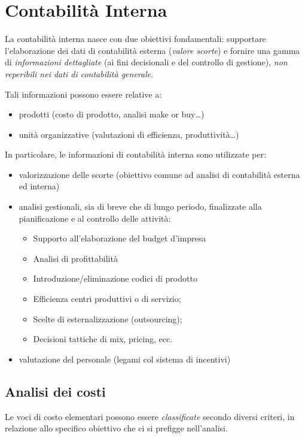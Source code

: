 \chapter{Contabilità Interna}
La contabilità interna nasce con due obiettivi fondamentali:
supportare l’elaborazione dei dati di contabilità esterna (\emph{valore scorte})
e fornire una gamma di \emph{informazioni dettagliate} (ai fini decisionali e del
controllo di gestione), \emph{non reperibili nei dati di contabilità generale}.

Tali informazioni possono essere relative a:
\begin{itemize}
    \item prodotti (costo di prodotto, analisi make or buy\dots)
    \item unità organizzative (valutazioni di efficienza, produttività\dots)
\end{itemize}

In particolare, le informazioni di contabilità interna sono utilizzate per:
\begin{itemize}
    \item valorizzazione delle scorte (obiettivo comune ad analisi di contabilità
    esterna ed interna)
    \item analisi gestionali, sia di breve che di lungo periodo, finalizzate alla
    pianificazione e al controllo delle attività:
    \begin{itemize}
        \item Supporto all’elaborazione del budget d’impresa
        \item Analisi di profittabilità
        \item Introduzione/eliminazione codici di prodotto
        \item Efficienza centri produttivi o di servizio;
        \item Scelte di esternalizzazione (outsourcing);
        \item Decisioni tattiche di mix, pricing, ecc.
    \end{itemize}
    \item valutazione del personale (legami col sistema di incentivi)
\end{itemize}

\section{Analisi dei costi}
Le voci di \gls{costo} elementari possono essere \emph{classificate} secondo diversi criteri,
in relazione allo specifico obiettivo che ci si prefigge nell’analisi.

